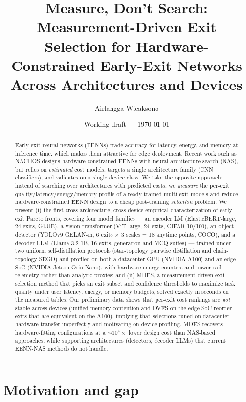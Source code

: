 \documentclass[11pt]{article}
\title{Measure, Don't Search: Measurement-Driven Exit Selection for
Hardware-Constrained Early-Exit Networks Across Architectures and Devices}
\author{Airlangga Wicaksono\\ \todo{affiliation, email, co-authors}}
\date{Working draft — \today}
\newcommand{\mdes}{MDES}
\begin{document}
\maketitle

\begin{abstract}
Early-exit neural networks (EENNs) trade accuracy for latency, energy, and
memory at inference time, which makes them attractive for edge deployment.
Recent work such as NACHOS designs hardware-constrained EENNs with neural
architecture search (NAS), but relies on \emph{estimated} cost models, targets
a single architecture family (CNN classifiers), and validates on a single
device class. We take the opposite approach: instead of searching over
architectures with predicted costs, we \emph{measure} the per-exit
quality/latency/energy/memory profile of already-trained multi-exit models and
reduce hardware-constrained EENN design to a cheap post-training
\emph{selection} problem. We present (i) the first cross-architecture,
cross-device empirical characterization of early-exit Pareto fronts, covering
four model families --- an encoder LM (ElasticBERT-large, 24 exits, GLUE), a
vision transformer (ViT-large, 24 exits, CIFAR-10/100), an object detector
(YOLOv9 GELAN-m, 6 exits $\times$ 3 scales = 18 anytime points, COCO), and a
decoder LLM (Llama-3.2-1B, 16 exits, generation and MCQ suites) --- trained
under two uniform self-distillation protocols (star-topology pairwise
distillation and chain-topology SEGD) and profiled on both a datacenter GPU
(NVIDIA A100) and an edge SoC (NVIDIA Jetson Orin Nano), with hardware energy
counters and power-rail telemetry rather than analytic proxies; and (ii)
\mdes{}, a measurement-driven exit-selection method that picks an exit subset
and confidence thresholds to maximize task quality under user latency, energy,
or memory budgets, solved exactly in seconds on the measured tables. Our
preliminary data shows that per-exit cost rankings are \emph{not} stable
across devices (unified-memory contention and DVFS on the edge SoC reorder
exits that are equivalent on the A100), implying that selections tuned on
datacenter hardware transfer imperfectly and motivating on-device profiling.
\mdes{} recovers hardware-fitting configurations at a
$\sim$$10^{4}\times$ lower design cost than NAS-based approaches, while
supporting architectures (detectors, decoder LLMs) that current EENN-NAS
methods do not handle.
\end{abstract}

\section{Motivation and gap}
\end{document}
